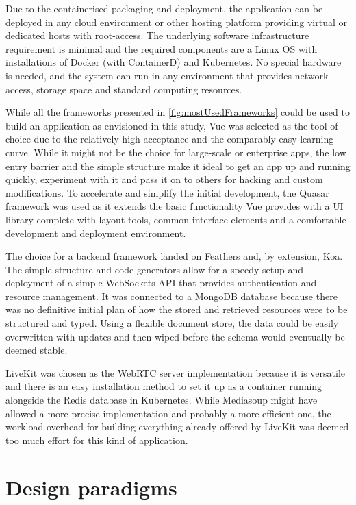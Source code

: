 Due to the containerised packaging and deployment, the application can be deployed in any cloud environment or other hosting platform providing virtual or dedicated hosts with root-access.
The underlying software infrastructure requirement is minimal and the required components are a Linux \ac{OS} with installations of Docker (with ContainerD) and Kubernetes.
No special hardware is needed, and the system can run in any environment that provides network access, storage space and standard computing resources.

While all the frameworks presented in \autoref{fig:mostUsedFrameworks} could be used to build an application as envisioned in this study, Vue was selected as the tool of choice due to the relatively high acceptance and the comparably easy learning curve.
While it might not be the choice for large-scale or enterprise apps, the low entry barrier and the simple structure make it ideal to get an app up and running quickly, experiment with it and pass it on to others for hacking and custom modifications.
To accelerate and simplify the initial development, the Quasar framework was used as it extends the basic functionality Vue provides with a \ac{UI} library complete with layout tools, common interface elements and a comfortable development and deployment environment.

The choice for a backend framework landed on Feathers and, by extension, Koa.
The simple structure and code generators allow for a speedy setup and deployment of a simple WebSockets \ac{API} that provides authentication and resource management.
It was connected to a MongoDB database because there was no definitive initial plan of how the stored and retrieved resources were to be structured and typed.
Using a flexible document store, the data could be easily overwritten with updates and then wiped before the schema would eventually be deemed stable.

LiveKit was chosen as the WebRTC server implementation because it is versatile and there is an easy installation method to set it up as a container running alongside the Redis database in Kubernetes.
While Mediasoup might have allowed a more precise implementation and probably a more efficient one, the workload overhead for building everything already offered by LiveKit was deemed too much effort for this kind of application.

\section{Design paradigms}
\label{sec:design-paradigms}

